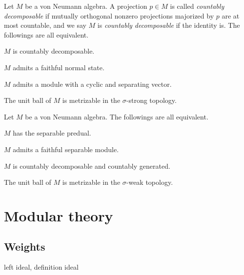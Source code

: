 \documentclass{../../large}
\begin{document}
\begin{prb}
Let $M$ be a von Neumann algebra.
A projection $p\in M$ is called \emph{countably decomposable} if mutually orthogonal nonzero projections majorized by $p$ are at most countable, and we say $M$ is \emph{countably decomposable} if the identity is.
The followings are all equivalent.
\begin{parts}
\item $M$ is countably decomposable.
\item $M$ admits a faithful normal state.
\item $M$ admits a module with a cyclic and separating vector.
\item The unit ball of $M$ is metrizable in the $\sigma$-strong topology.
\end{parts}
\end{prb}
\begin{pf}
\end{pf}

\begin{prb}
Let $M$ be a von Neumann algebra.
The followings are all equivalent.
\begin{parts}
\item $M$ has the separable predual.
\item $M$ admits a faithful separable module.
\item $M$ is countably decomposable and countably generated.
\item The unit ball of $M$ is metrizable in the $\sigma$-weak topology.
\end{parts}
\end{prb}
\begin{pf}
\end{pf}




\chapter{Modular theory}


\section{Weights}


\begin{prb}
left ideal, definition ideal
\end{prb}
\end{document}
